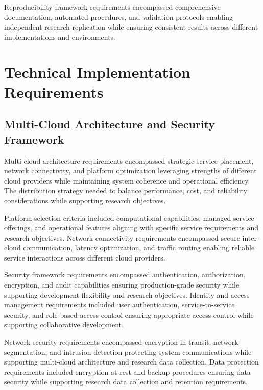 Reproducibility framework requirements encompassed comprehensive documentation, automated procedures, and validation protocols enabling independent research replication while ensuring consistent results across different implementations and environments.

\section{Technical Implementation Requirements}

\subsection{Multi-Cloud Architecture and Security Framework}

Multi-cloud architecture requirements encompassed strategic service placement, network connectivity, and platform optimization leveraging strengths of different cloud providers while maintaining system coherence and operational efficiency. The distribution strategy needed to balance performance, cost, and reliability considerations while supporting research objectives.

Platform selection criteria included computational capabilities, managed service offerings, and operational features aligning with specific service requirements and research objectives. Network connectivity requirements encompassed secure inter-cloud communication, latency optimization, and traffic routing enabling reliable service interactions across different cloud providers.


Security framework requirements encompassed authentication, authorization, encryption, and audit capabilities ensuring production-grade security while supporting development flexibility and research objectives. Identity and access management requirements included user authentication, service-to-service security, and role-based access control ensuring appropriate access control while supporting collaborative development.

Network security requirements encompassed encryption in transit, network segmentation, and intrusion detection protecting system communications while supporting multi-cloud architecture and research data collection. Data protection requirements included encryption at rest and backup procedures ensuring data security while supporting research data collection and retention requirements.

